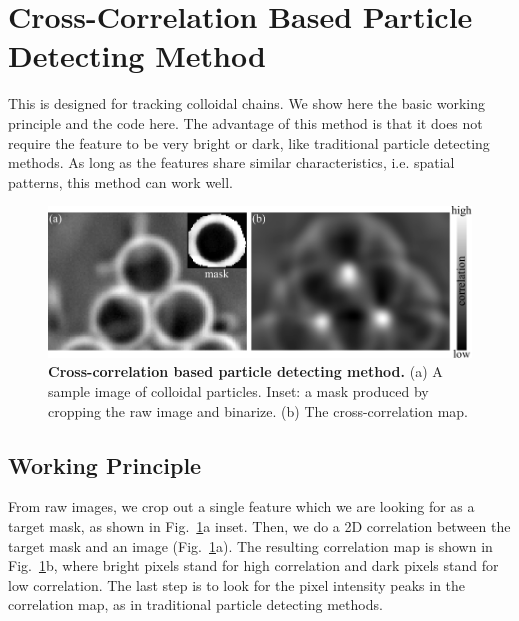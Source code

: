 \section{Cross-Correlation Based Particle Detecting Method}
\label{sec:A-cross-correlation-tracking-method}
This is designed for tracking colloidal chains. We show here the basic working principle and the code here. The advantage of this method is that it does not require the feature to be very bright or dark, like traditional particle detecting methods. As long as the features share similar characteristics, i.e. spatial patterns, this method can work well.

\begin{figure}[h]
	\begin{center}
	\includegraphics[width=5.5in]{Figs/A-2/corrTrack.pdf}
	\end{center}
	\caption[Cross-correlation Based Particle Detecting Method]
	{
	\textbf{Cross-correlation based particle detecting method.}
  (a) A sample image of colloidal particles. Inset: a mask produced by cropping the raw image and binarize.
  (b) The cross-correlation map.
	}
	\label{fig:corr-track}
\end{figure}

\subsection{Working Principle}
From raw images, we crop out a single feature which we are looking for as a target mask, as shown in Fig.~\ref{fig:corr-track}a inset. Then, we do a 2D correlation between the target mask and an image (Fig.~\ref{fig:corr-track}a). The resulting correlation map is shown in Fig.~\ref{fig:corr-track}b, where bright pixels stand for high correlation and dark pixels stand for low correlation. The last step is to look for the pixel intensity peaks in the correlation map, as in traditional particle detecting methods.



